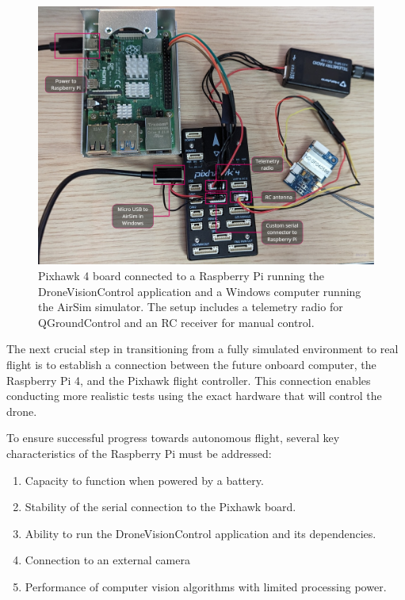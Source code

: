 \begin{figure}[H]
  \centering
  \includegraphics[width=\textwidth, keepaspectratio]{img/hitl-setup-picture.jpg}
  \caption{Pixhawk 4 board connected to a Raspberry Pi running the DroneVisionControl application and a Windows computer running the AirSim simulator. The setup includes a telemetry radio for QGroundControl and an RC receiver for manual control.}
  \label{fig:hitl-setup-picture}
\end{figure}

The next crucial step in transitioning from a fully simulated environment to real flight is to establish a connection between the future onboard computer, the Raspberry Pi 4, and the Pixhawk flight controller. This connection enables conducting more realistic tests using the exact hardware that will control the drone. 

To ensure successful progress towards autonomous flight, several key characteristics of the Raspberry Pi must be addressed:
\begin{enumerate}
    \item Capacity to function when powered by a battery.
    \item Stability of the serial connection to the Pixhawk board.
    \item Ability to run the DroneVisionControl application and its dependencies.
    \item Connection to an external camera
    \item Performance of computer vision algorithms with limited processing power.
\end{enumerate}

